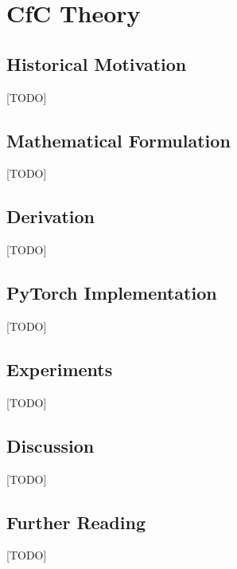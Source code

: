 
\chapter{CfC Theory}
\label{ch:10_cfc_theory}


\section{Historical Motivation}
[TODO]

\section{Mathematical Formulation}
[TODO]

\section{Derivation}
[TODO]

\section{PyTorch Implementation}
[TODO]

\section{Experiments}
[TODO]

\section{Discussion}
[TODO]

\section{Further Reading}
[TODO]
